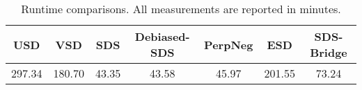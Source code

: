 \begin{table}[t!]
    \centering
    \caption{Runtime comparisons. All measurements are reported in minutes.}
    \begin{tabular}{ccccccc}
    \hline
    \textbf{USD} & \textbf{VSD} & \textbf{SDS} & \textbf{Debiased-SDS} & \textbf{PerpNeg} & \textbf{ESD} & \textbf{SDS-Bridge} \\ 
    \hline
    297.34 & 180.70 & 43.35 & 43.58 & 45.97 & 201.55 & 73.24 \\ 
    \hline
    \end{tabular}
    \label{tab:app_runtime}
\end{table}